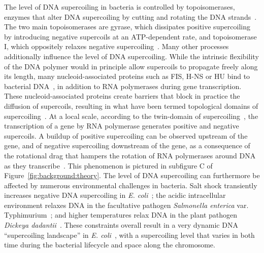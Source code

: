 The level of DNA supercoiling in bacteria is controlled by topoisomerases, enzymes that alter DNA supercoiling by cutting and rotating the DNA strands~\citep{duprey2021}.
The two main topoisomerases are gyrase, which dissipates positive supercoiling by introducing negative supercoils at an ATP-dependent rate, and topoisomerase I, which oppositely relaxes negative supercoiling~\citep{martisb.2019}.
Many other processes additionally influence the level of DNA supercoiling.
While the intrinsic flexibility of the DNA polymer would in principle allow supercoils to propagate freely along its length, many nucleoid-associated proteins such as FIS, H-NS or HU bind to bacterial DNA~\citep{krogh2018}, in addition to RNA polymerases during gene transcription.
These nucleoid-associated proteins create barriers that block in practice the diffusion of supercoils, resulting in what have been termed topological domains of supercoiling~\citep{postow2004}.
At a local scale, according to the twin-domain of supercoiling~\citep{liu1987}, the transcription of a gene by RNA polymerase generates positive and negative supercoils.
A buildup of positive supercoiling can be observed upstream of the gene, and of negative supercoiling downstream of the gene, as a consequence of the rotational drag that hampers the rotation of RNA polymerases around DNA as they transcribe~\citep{visser2022}.
This phenomenon is pictured in subfigure C of Figure~\ref{fig:background:theory}.
The level of DNA supercoiling can furthermore be affected by numerous environmental challenges in bacteria.
Salt shock transiently increases negative DNA supercoiling in \emph{E. coli}~\citep{hsieh1991}; the acidic intracellular environment relaxes DNA in the facultative pathogen \emph{Salmonella enterica} var. Typhimurium~\citep{marshall2000}; and higher temperatures relax DNA in the plant pathogen \emph{Dickeya dadantii}~\citep{herault2014}.
These constraints overall result in a very dynamic DNA ``supercoiling landscape'' in \emph{E. coli}~\citep{visser2022}, with a supercoiling level that varies in both time during the bacterial lifecycle and space along the chromosome.


